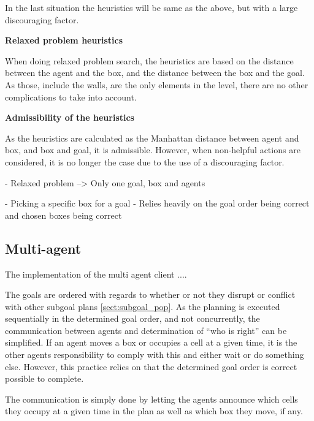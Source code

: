\documentclass[Main]{subfiles}
\begin{document}
In the last situation the heuristics will be same as the above, but with a large discouraging factor. 


\textbf{Relaxed problem heuristics}

When doing relaxed problem search, the heuristics are based on the distance between the agent and the box, and the distance between the box and the goal. As those, include the walls, are the only elements in the level, there are no other complications to take into account. 



\textbf{Admissibility of the heuristics}

As the heuristics are calculated as the Manhattan distance between agent and box, and box and goal, it is admissible. However, when non-helpful actions are considered, it is no longer the case due to the use of a discouraging factor. 



- Relaxed problem --> Only one goal, box and agents

- Picking a specific box for a goal
- Relies heavily on the goal order being correct and chosen boxes being correct





\subsection{Multi-agent} 

The implementation of the multi agent client  .... 



The goals are ordered with regards to whether or not they disrupt or conflict with other subgoal plans \autoref{sect:subgoal_pop}. As the planning is executed sequentially in the determined goal order, and not concurrently, the communication between agents and determination of ``who is right'' can be simplified. 
If an agent moves a box or occupies a cell at a given time, it is the other agents responsibility to comply with this and either wait or do something else. However, this practice relies on that the determined goal order is correct possible to complete. 

The communication is simply done by letting the agents announce which cells they occupy at a given time in the plan as well as which box they move, if any. 
\end{document}
